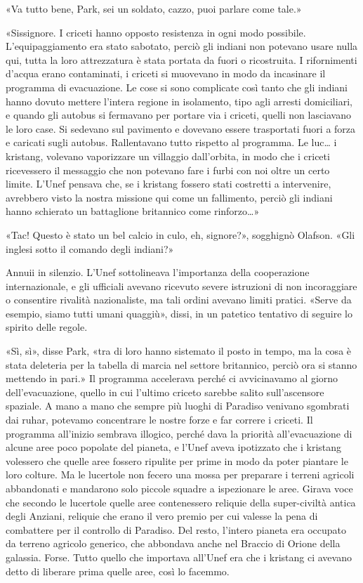 «Va tutto bene, Park, sei un soldato, cazzo, puoi parlare come tale.»

«Sissignore. I criceti hanno opposto resistenza in ogni modo possibile.
L'equipaggiamento era stato sabotato, perciò gli indiani non potevano
usare nulla qui, tutta la loro attrezzatura è stata portata da fuori o
ricostruita. I rifornimenti d'acqua erano contaminati, i criceti si
muovevano in modo da incasinare il programma di evacuazione. Le cose si
sono complicate così tanto che gli indiani hanno dovuto mettere l'intera
regione in isolamento, tipo agli arresti domiciliari, e quando gli
autobus si fermavano per portare via i criceti, quelli non lasciavano le
loro case. Si sedevano sul pavimento e dovevano essere trasportati fuori
a forza e caricati sugli autobus. Rallentavano tutto rispetto al
programma. Le luc\ldots{} i kristang, volevano vaporizzare un villaggio
dall'orbita, in modo che i criceti ricevessero il messaggio che non
potevano fare i furbi con noi oltre un certo limite. L'Unef pensava che,
se i kristang fossero stati costretti a intervenire, avrebbero visto la
nostra missione qui come un fallimento, perciò gli indiani hanno
schierato un battaglione britannico come rinforzo\ldots»

«Tac! Questo è stato un bel calcio in culo, eh, signore?», sogghignò
Olafson. «Gli inglesi sotto il comando degli indiani?»

Annuii in silenzio. L'Unef sottolineava l'importanza della cooperazione
internazionale, e gli ufficiali avevano ricevuto severe istruzioni di
non incoraggiare o consentire rivalità nazionaliste, ma tali ordini
avevano limiti pratici. «Serve da esempio, siamo tutti umani quaggiù»,
dissi, in un patetico tentativo di seguire lo spirito delle regole.

«Sì, sì», disse Park, «tra di loro hanno sistemato il posto in tempo, ma
la cosa è stata deleteria per la tabella di marcia nel settore
britannico, perciò ora si stanno mettendo in pari.» Il programma
accelerava perché ci avvicinavamo al giorno dell'evacuazione, quello in
cui l'ultimo criceto sarebbe salito sull'ascensore spaziale. A mano a
mano che sempre più luoghi di Paradiso venivano sgombrati dai ruhar,
potevamo concentrare le nostre forze e far correre i criceti. Il
programma all'inizio sembrava illogico, perché dava la priorità
all'evacuazione di alcune aree poco popolate del pianeta, e l'Unef aveva
ipotizzato che i kristang volessero che quelle aree fossero ripulite per
prime in modo da poter piantare le loro colture. Ma le lucertole non
fecero una mossa per preparare i terreni agricoli abbandonati e
mandarono solo piccole squadre a ispezionare le aree. Girava voce che
secondo le lucertole quelle aree contenessero reliquie della
super-civiltà antica degli Anziani, reliquie che erano il vero premio
per cui valesse la pena di combattere per il controllo di Paradiso. Del
resto, l'intero pianeta era occupato da terreno agricolo generico, che
abbondava anche nel Braccio di Orione della galassia. Forse. Tutto
quello che importava all'Unef era che i kristang ci avevano detto di
liberare prima quelle aree, così lo facemmo.

